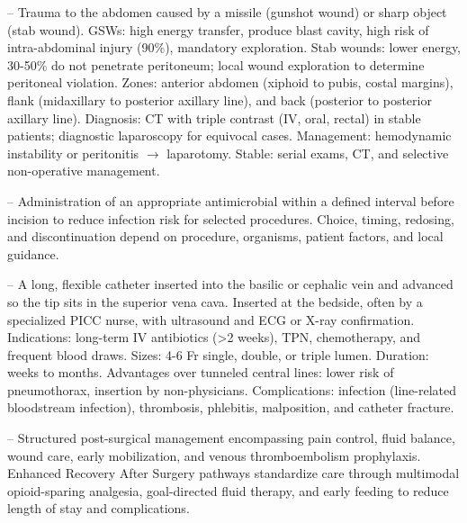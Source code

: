 -- Trauma to the abdomen caused by a missile (gunshot wound) or sharp object (stab wound). GSWs: high energy transfer, produce blast cavity, high risk of intra-abdominal injury (90\%), mandatory exploration. Stab wounds: lower energy, 30-50\% do not penetrate peritoneum; local wound exploration to determine peritoneal violation. Zones: anterior abdomen (xiphoid to pubis, costal margins), flank (midaxillary to posterior axillary line), and back (posterior to posterior axillary line). Diagnosis: CT with triple contrast (IV, oral, rectal) in stable patients; diagnostic laparoscopy for equivocal cases. Management: hemodynamic instability or peritonitis $\rightarrow$ laparotomy. Stable: serial exams, CT, and selective non-operative management.

-- Administration of an appropriate antimicrobial within a defined interval before incision to reduce infection risk for selected procedures. Choice, timing, redosing, and discontinuation depend on procedure, organisms, patient factors, and local guidance.

-- A long, flexible catheter inserted into the basilic or cephalic vein and advanced so the tip sits in the superior vena cava. Inserted at the bedside, often by a specialized PICC nurse, with ultrasound and ECG or X-ray confirmation. Indications: long-term IV antibiotics (>2 weeks), TPN, chemotherapy, and frequent blood draws. Sizes: 4-6 Fr single, double, or triple lumen. Duration: weeks to months. Advantages over tunneled central lines: lower risk of pneumothorax, insertion by non-physicians. Complications: infection (line-related bloodstream infection), thrombosis, phlebitis, malposition, and catheter fracture.

-- Structured post-surgical management encompassing pain control, fluid balance, wound care, early mobilization, and venous thromboembolism prophylaxis. Enhanced Recovery After Surgery pathways standardize care through multimodal opioid-sparing analgesia, goal-directed fluid therapy, and early feeding to reduce length of stay and complications.

